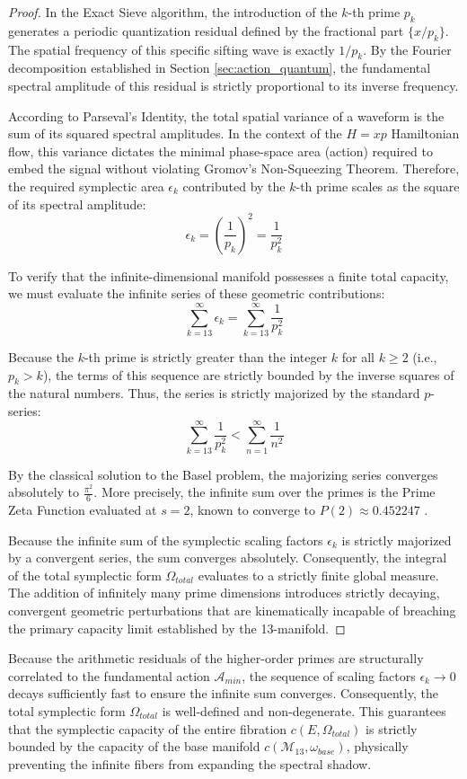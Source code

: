 \documentclass[sn-mathphys-num, pdflatex]{sn-jnl}
\begin{document}
\begin{proof}
In the Exact Sieve algorithm, the introduction of the $k$-th prime $p_k$ generates a periodic quantization residual defined by the fractional part $\{x/p_k\}$. The spatial frequency of this specific sifting wave is exactly $1/p_k$. By the Fourier decomposition established in Section \ref{sec:action_quantum}, the fundamental spectral amplitude of this residual is strictly proportional to its inverse frequency. 

According to Parseval's Identity, the total spatial variance of a waveform is the sum of its squared spectral amplitudes. In the context of the $H=xp$ Hamiltonian flow, this variance dictates the minimal phase-space area (action) required to embed the signal without violating Gromov's Non-Squeezing Theorem. Therefore, the required symplectic area $\epsilon_k$ contributed by the $k$-th prime scales as the square of its spectral amplitude:
$$ \epsilon_k = \left( \frac{1}{p_k} \right)^2 = \frac{1}{p_k^2} $$

To verify that the infinite-dimensional manifold possesses a finite total capacity, we must evaluate the infinite series of these geometric contributions:
$$ \sum_{k=13}^{\infty} \epsilon_k = \sum_{k=13}^{\infty} \frac{1}{p_k^2} $$

Because the $k$-th prime is strictly greater than the integer $k$ for all $k \ge 2$ (i.e., $p_k > k$), the terms of this sequence are strictly bounded by the inverse squares of the natural numbers. Thus, the series is strictly majorized by the standard $p$-series:
$$ \sum_{k=13}^{\infty} \frac{1}{p_k^2} < \sum_{n=1}^{\infty} \frac{1}{n^2} $$

By the classical solution to the Basel problem, the majorizing series converges absolutely to $\frac{\pi^2}{6}$. More precisely, the infinite sum over the primes is the Prime Zeta Function evaluated at $s=2$, known to converge to $P(2) \approx 0.452247$ \cite{froberg1968prime}.

Because the infinite sum of the symplectic scaling factors $\epsilon_k$ is strictly majorized by a convergent series, the sum converges absolutely. Consequently, the integral of the total symplectic form $\Omega_{total}$ evaluates to a strictly finite global measure. The addition of infinitely many prime dimensions introduces strictly decaying, convergent geometric perturbations that are kinematically incapable of breaching the primary capacity limit established by the 13-manifold.
\end{proof}
Because the arithmetic residuals of the higher-order primes are structurally correlated to the fundamental action $\mathcal{A}_{min}$, the sequence of scaling factors $\epsilon_k \rightarrow 0$ decays sufficiently fast to ensure the infinite sum converges. Consequently, the total symplectic form $\Omega_{total}$ is well-defined and non-degenerate. This guarantees that the symplectic capacity of the entire fibration $c(E, \Omega_{total})$ is strictly bounded by the capacity of the base manifold $c(\mathcal{M}_{13}, \omega_{base})$, physically preventing the infinite fibers from expanding the spectral shadow.
\end{document}
